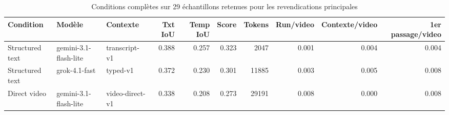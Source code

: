 \begin{table}[ht]
\centering
\scriptsize
\caption{Conditions compl\`etes sur 29 \'echantillons retenues pour les revendications principales}
\label{tab:main-full-runs}
\begin{tabularx}{\textwidth}{>{\raggedright\arraybackslash}p{}>{\raggedright\arraybackslash}p{}>{\raggedright\arraybackslash}p{}rrrrrrr}
\toprule
Condition & Mod\`ele & Contexte & Txt IoU & Temp IoU & Score & Tokens & Run/video & Contexte/video & 1er passage/video \\
\midrule
Structured text & gemini-3.1-flash-lite & transcript-v1 & 0.388 & 0.257 & 0.323 & 2047 & 0.001 & 0.004 & 0.004 \\
Structured text & grok-4.1-fast & typed-v1 & 0.372 & 0.230 & 0.301 & 11885 & 0.003 & 0.005 & 0.008 \\
Direct video & gemini-3.1-flash-lite & video-direct-v1 & 0.338 & 0.208 & 0.273 & 29191 & 0.008 & 0.000 & 0.008 \\
\bottomrule
\end{tabularx}
\end{table}
